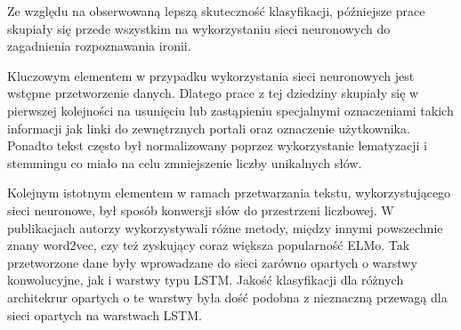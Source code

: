 Ze względu na obserwowaną lepszą skuteczność klasyfikacji, późniejsze prace skupiały się przede wszystkim na wykorzystaniu sieci neuronowych do zagadnienia rozpoznawania ironii.

Kluczowym elementem w przypadku wykorzystania sieci neuronowych jest wstępne przetworzenie danych. Dlatego prace \cite{Baziotis2018}  \cite{Huang2017}  \cite{Ilic2018} z tej dziedziny skupiały się w pierwszej kolejności na usunięciu lub zastąpieniu specjalnymi oznaczeniami takich informacji jak linki do zewnętrznych portali oraz oznaczenie użytkownika. Ponadto tekst często był normalizowany poprzez wykorzystanie lematyzacji i stemmingu co miało na celu zmniejszenie liczby unikalnych słów. 

Kolejnym istotnym elementem w ramach przetwarzania tekstu, wykorzystującego sieci neuronowe, był sposób konwersji słów do przestrzeni liczbowej. W publikacjach autorzy wykorzystywali różne metody, między innymi powszechnie znany word2vec, czy też zyskujący coraz większa popularność ELMo. Tak przetworzone dane były wprowadzane do sieci zarówno opartych o warstwy konwolucyjne, jak i warstwy typu LSTM. Jakość klasyfikacji dla różnych architekrur opartych o te warstwy była dość podobna z nieznaczną przewagą dla sieci opartych na warstwach LSTM.



